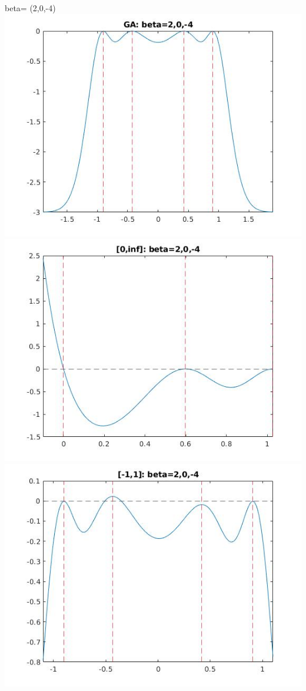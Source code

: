 \documentclass[11pt]{beamer}
\begin{document}
\begin{frame}{beta= (2,0,-4)}
\includegraphics[scale=0.18]{quadplots/GA_2.jpg}
\includegraphics[scale=0.18]{quadplots/positive_2.jpg}
\includegraphics[scale=0.18]{quadplots/11_2.jpg}

\end{frame}
\end{document}
